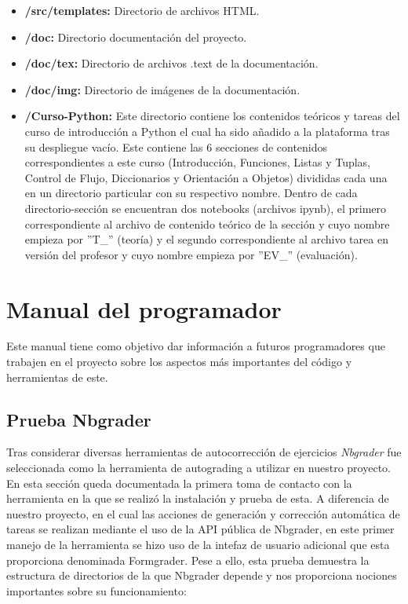 \begin{itemize}
\item \textbf{/src/templates:} Directorio de archivos HTML.
\item \textbf{/doc:} Directorio documentación del proyecto.
\item \textbf{/doc/tex:} Directorio de archivos .text de la documentación.
\item \textbf{/doc/img:} Directorio de imágenes de la documentación.
\item \textbf{/Curso-Python:} Este directorio contiene los contenidos teóricos y tareas del curso de introducción a Python el cual ha sido añadido a la plataforma tras su despliegue vacío. Este contiene las 6 secciones de contenidos correspondientes a este curso (Introducción, Funciones, Listas y Tuplas, Control de Flujo, Diccionarios y Orientación a Objetos) divididas cada una en un directorio particular con su respectivo nombre. Dentro de cada directorio-sección se encuentran dos notebooks (archivos ipynb), el primero correspondiente al archivo de contenido teórico de la sección y cuyo nombre empieza por ''T\_'' (teoría) y el segundo correspondiente al archivo tarea en versión del profesor y cuyo nombre empieza por ''EV\_'' (evaluación).  

\end{itemize}

\section{Manual del programador}
Este manual tiene como objetivo dar información a futuros programadores que trabajen en el proyecto sobre los aspectos más importantes del código y herramientas de este.

\subsection{Prueba Nbgrader}
Tras considerar diversas herramientas de autocorrección de ejercicios \textit{Nbgrader} fue seleccionada como la herramienta de autograding a utilizar en nuestro proyecto. En esta sección queda documentada la primera toma de contacto con la herramienta en la que se realizó la instalación y prueba de esta. A diferencia de nuestro proyecto, en el cual las acciones de generación y corrección automática de tareas se realizan mediante el uso de la API pública de Nbgrader, en este primer manejo de la herramienta se hizo uso de la intefaz de usuario adicional que esta proporciona denominada Formgrader. Pese a ello, esta prueba demuestra la estructura de directorios de la que Nbgrader depende y nos proporciona nociones importantes sobre su funcionamiento:

